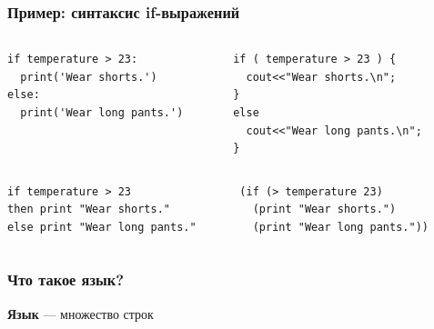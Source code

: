 \documentclass{beamer}
\begin{document}
\begin{frame}[fragile]
  \transwipe[direction=90]
  \frametitle{Пример: синтаксис if-выражений}
\begin{columns}
  \begin{column}{0.5\textwidth}
    \begin{verbatim}
if temperature > 23:
  print('Wear shorts.')
else:
  print('Wear long pants.')
    \end{verbatim}
  \end{column}

  \begin{column}{0.5\textwidth}
    \begin{verbatim}
if ( temperature > 23 ) {      
  cout<<"Wear shorts.\n";
}
else 
  cout<<"Wear long pants.\n"; 
}
    \end{verbatim}
  \end{column}
\end{columns}

\vspace{30pt}

\begin{columns}
  \begin{column}{0.5\textwidth}
    \begin{verbatim}
if temperature > 23 
then print "Wear shorts."
else print "Wear long pants."
    \end{verbatim}
  \end{column}

  \begin{column}{0.5\textwidth}
    \begin{verbatim}
(if (> temperature 23) 
  (print "Wear shorts.")
  (print "Wear long pants."))  
    \end{verbatim}
  \end{column}
\end{columns}

\end{frame}

\begin{frame}[fragile]
  \transwipe[direction=90]
  \frametitle{Что такое язык?}
  \pause
  
  \begin{center}
    \textbf{Язык} --- множество строк
  \end{center}
\end{frame}
\end{document}
